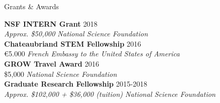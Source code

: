\documentclass{resume} %
\begin{document}
\begin{minipage}{\textwidth}

\begin{rSection}{Grants \& Awards}
  \vspace{.15cm}
  


{\bf NSF INTERN Grant} \hfill {2018} \\ 
{\em Approx. \${50,000}} \hfill {\em National Science Foundation} \\


{\bf Chateaubriand STEM Fellowship} \hfill {2016} \\ 
{\euro{5.000}} \hfill {\em French Embassy to the United States of America} \\


{\bf GROW Travel Award} \hfill {2016} \\ 
{\$5,000} \hfill {\em National Science Foundation} \\


{\bf Graduate Research Fellowship} \hfill {2015-2018} \\ 
{\em Approx. \$102,000 + \$36,000 (tuition)} \hfill {\em National Science Foundation} \\





\end{rSection}
\end{minipage}
\end{document}
